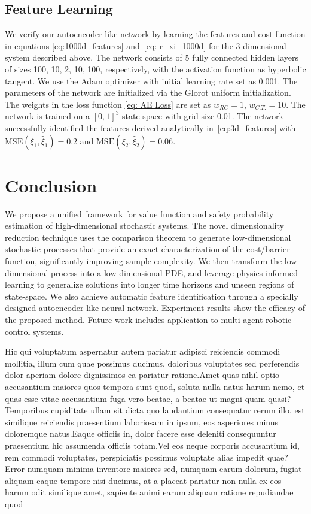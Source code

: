 \documentclass[letterpaper]{article} %
\begin{document}
\subsection{Feature Learning}
We verify our autoencoder-like network by learning the features and cost function in equations \eqref{eq:1000d_features} and~\eqref{eq: r_xi_1000d} for the 3-dimensional system described above. The network consists of 5 fully connected hidden layers of sizes 100, 10, 2, 10, 100, respectively, with the activation function as hyperbolic tangent. We use the Adam optimizer with initial learning rate set as 0.001. The parameters of the network are initialized via the Glorot uniform initialization. The weights in the loss function \eqref{eq: AE Loss} are set as $w_{RC}=1, \,w_{C.T.}=10$. The network is trained on a $[0, 1]^3$ state-space with grid size 0.01. The network successfully identified the features derived analytically in~\eqref{eq:3d_features} with $\mathrm{MSE}(\xi_1, \hat{\xi}_1)=0.2$ and $\mathrm{MSE}(\xi_2, \hat{\xi}_2)=0.06$.



\section{Conclusion}
\label{sec:conclusion}

We propose a unified framework for value function and safety probability estimation of high-dimensional stochastic systems. The novel dimensionality reduction technique uses the comparison theorem to generate low-dimensional stochastic processes that provide an exact characterization of the cost/barrier function, significantly improving sample complexity. We then transform the low-dimensional process into a low-dimensional PDE, and leverage physics-informed learning to generalize solutions into longer time horizons and unseen regions of state-space. We also achieve automatic feature identification through a specially designed autoencoder-like neural network. Experiment results show the efficacy of the proposed method. Future work includes application to multi-agent robotic control systems.




Hic qui voluptatum aspernatur autem pariatur adipisci reiciendis commodi mollitia, illum cum quae possimus ducimus, doloribus voluptates sed perferendis dolor aperiam dolore dignissimos ea pariatur ratione.Amet quas nihil optio accusantium maiores quos tempora sunt quod, soluta nulla natus harum nemo, et quas esse vitae accusantium fuga vero beatae, a beatae ut magni quam quasi?Temporibus cupiditate ullam sit dicta quo laudantium consequatur rerum illo, est similique reiciendis praesentium laboriosam in ipsum, eos asperiores minus doloremque natus.Eaque officiis in, dolor facere esse deleniti consequuntur praesentium hic assumenda officiis totam.Vel eos neque corporis accusantium id, rem commodi voluptates, perspiciatis possimus voluptate alias impedit quae?Error numquam minima inventore maiores sed, numquam earum dolorum, fugiat aliquam eaque tempore nisi ducimus, at a placeat pariatur non nulla ex eos harum odit similique amet, sapiente animi earum aliquam ratione repudiandae quod

\end{document}
